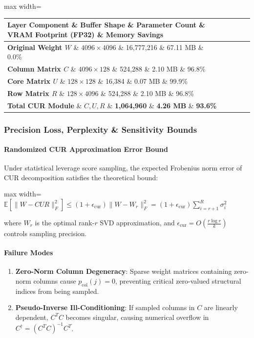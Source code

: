 \begin{center}
\begin{adjustbox}{max width=\columnwidth}
\renewcommand{\arraystretch}{1.2}
\begin{tabular}{lllll}
\toprule
Layer Component \& Buffer Shape \& Parameter Count \& VRAM Footprint (FP32) \& Memory Savings \\
\midrule
\textbf{Original Weight $W$} \& $4096 \times 4096$ \& 16,777,216 \& 67.11 MB \& 0.0\% \\
\textbf{Column Matrix $C$} \& $4096 \times 128$ \& 524,288 \& 2.10 MB \& 96.8\% \\
\textbf{Core Matrix $U$} \& $128 \times 128$ \& 16,384 \& 0.07 MB \& 99.9\% \\
\textbf{Row Matrix $R$} \& $128 \times 4096$ \& 524,288 \& 2.10 MB \& 96.8\% \\
\textbf{Total CUR Module} \& $C, U, R$ \& \textbf{1,064,960} \& \textbf{4.26 MB} \& \textbf{93.6\%} \\

\bottomrule
\end{tabular}
\end{adjustbox}
\end{center}

\subsubsection*{Precision Loss, Perplexity \& Sensitivity Bounds}

\paragraph{Randomized CUR Approximation Error Bound}
Under statistical leverage score sampling, the expected Frobenius norm error of CUR decomposition satisfies the theoretical bound:

\begin{center}
\begin{adjustbox}{max width=\columnwidth}
$\displaystyle
\mathbb{E}\left[ \|W - C U R\|_F^2 \right] \le (1 + \epsilon_{\text{cur}}) \|W - W_r\|_F^2 = (1 + \epsilon_{\text{cur}}) \sum_{i=r+1}^{R} \sigma_i^2
$
\end{adjustbox}
\end{center}

where $W_r$ is the optimal rank-$r$ SVD approximation, and $\epsilon_{\text{cur}} = O\left(\frac{r \log r}{k}\right)$ controls sampling precision.

\paragraph{Failure Modes}
\begin{enumerate}
\item \textbf{Zero-Norm Column Degeneracy}: Sparse weight matrices containing zero-norm columns cause $p_{\text{col}}(j) = 0$, preventing critical zero-valued structural indices from being sampled.
\item \textbf{Pseudo-Inverse Ill-Conditioning}: If sampled columns in $C$ are linearly dependent, $C^T C$ becomes singular, causing numerical overflow in $C^\dagger = (C^T C)^{-1} C^T$.


\end{enumerate}
